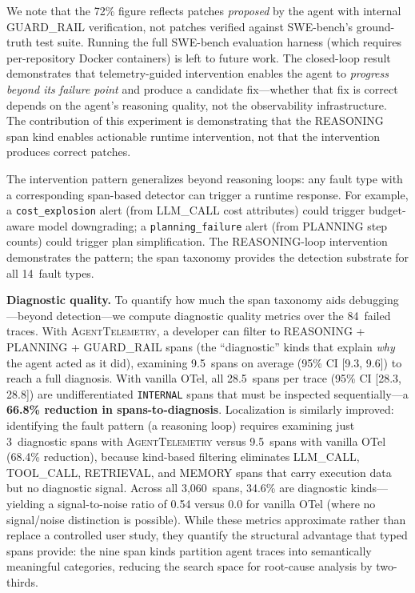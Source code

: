 \documentclass[sigplan,10pt,screen]{acmart}
\begin{document}
We note that the 72\% figure reflects patches \emph{proposed} by the agent with internal GUARD\_RAIL verification, not patches verified against SWE-bench's ground-truth test suite. Running the full SWE-bench evaluation harness (which requires per-repository Docker containers) is left to future work. The closed-loop result demonstrates that telemetry-guided intervention enables the agent to \emph{progress beyond its failure point} and produce a candidate fix---whether that fix is correct depends on the agent's reasoning quality, not the observability infrastructure. The contribution of this experiment is demonstrating that the REASONING span kind enables actionable runtime intervention, not that the intervention produces correct patches.

The intervention pattern generalizes beyond reasoning loops: any fault type with a corresponding span-based detector can trigger a runtime response. For example, a \texttt{cost\_explosion} alert (from LLM\_CALL cost attributes) could trigger budget-aware model downgrading; a \texttt{planning\_failure} alert (from PLANNING step counts) could trigger plan simplification. The REASONING-loop intervention demonstrates the pattern; the span taxonomy provides the detection substrate for all 14~fault types.

\textbf{Diagnostic quality.}
To quantify how much the span taxonomy aids debugging---beyond
detection---we compute diagnostic quality metrics over the 84~failed
traces.  With \textsc{AgentTelemetry}, a developer can filter to
REASONING + PLANNING + GUARD\_RAIL spans (the ``diagnostic'' kinds
that explain \emph{why} the agent acted as it did), examining
9.5~spans on average (95\% CI [9.3, 9.6]) to reach a full diagnosis.
With vanilla OTel, all 28.5~spans per trace (95\% CI [28.3, 28.8]) are
undifferentiated \texttt{INTERNAL} spans that must be inspected
sequentially---a \textbf{66.8\% reduction in spans-to-diagnosis}.
Localization is similarly improved: identifying the fault pattern
(a reasoning loop) requires examining just 3~diagnostic spans with
\textsc{AgentTelemetry} versus 9.5~spans with vanilla OTel (68.4\%
reduction), because kind-based filtering eliminates LLM\_CALL,
TOOL\_CALL, RETRIEVAL, and MEMORY spans that carry execution data
but no diagnostic signal.  Across all 3{,}060~spans, 34.6\% are
diagnostic kinds---yielding a signal-to-noise ratio of 0.54 versus
0.0 for vanilla OTel (where no signal/noise distinction is possible).
While these metrics approximate rather than replace a controlled user
study, they quantify the structural advantage that typed spans provide:
the nine span kinds partition agent traces into semantically meaningful
categories, reducing the search space for root-cause analysis by
two-thirds.
\end{document}
